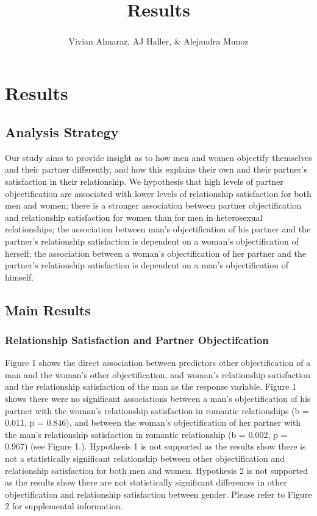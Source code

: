 \documentclass[
  english,
  man,floatsintext]{apa6}
\title{Results}
\author{Vivian Almaraz\textsuperscript{}, AJ Haller\textsuperscript{}, \& Alejandra Munoz\textsuperscript{}}
\date{}
\affiliation{\phantom{0}}
\begin{document}
\maketitle

\hypertarget{results}{%
\section{Results}\label{results}}

\hypertarget{analysis-strategy}{%
\subsection{Analysis Strategy}\label{analysis-strategy}}

Our study aims to provide insight as to how men and women objectify themselves and their partner differently, and how this explains their own and their partner's satisfaction in their relationship. We hypothesis that high levels of partner objectification are associated with lower levels of relationship satisfaction for both men and women; there is a stronger association between partner objectification and relationship satisfaction for women than for men in heterosexual relationships; the association between man's objectification of his partner and the partner's relationship satisfaction is dependent on a woman's objectification of herself; the association between a woman's objectification of her partner and the partner's relationship satisfaction is dependent on a man's objectification of himself.

\hypertarget{main-results}{%
\subsection{Main Results}\label{main-results}}

\hypertarget{relationship-satisfaction-and-partner-objectifcation}{%
\subsubsection{Relationship Satisfaction and Partner Objectifcation}\label{relationship-satisfaction-and-partner-objectifcation}}

Figure 1 shows the direct association between predictors other objectification of a man and the woman's other objectification, and woman's relationship satisfaction and the relationship satisfaction of the man as the response variable. Figure 1 shows there were no significant associations between a man's objectification of his partner with the woman's relationship satisfaction in romantic relationships (b = 0.011, p = 0.846), and between the woman's objectification of her partner with the man's relationship satisfaction in romantic relationship (b = 0.002, p = 0.967) (see Figure 1.). Hypothesis 1 is not supported as the results show there is not a statistically significant relationship between other objectification and relationship satisfaction for both men and women. Hypothesis 2 is not supported as the results show there are not statistically significant differences in other objectification and relationship satisfaction between gender. Please refer to Figure 2 for supplemental information.
\end{document}

